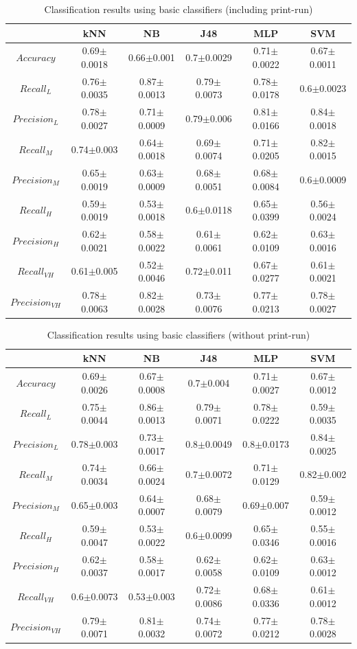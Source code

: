 \documentclass{llncs}
\begin{document}
\begin{table}
\caption{Classification results using basic classifiers (including print-run)}
\begin{centering}
\begin{tabular}{|c|c|c|c|c|c|}
\hline 
 & kNN & NB & J48 & MLP & SVM\tabularnewline
\hline 
\hline 
$Accuracy$  & 0.69$\pm$0.0018 & 0.66$\pm$0.001 & 0.7$\pm$0.0029 & 0.71$\pm$0.0022 & 0.67$\pm$0.0011\tabularnewline
\hline 
\hline 
$Recall_{L}$ & 0.76$\pm$0.0035 & 0.87$\pm$0.0013 & 0.79$\pm$0.0073 & 0.78$\pm$0.0178 & 0.6$\pm$0.0023\tabularnewline
\hline 
$Precision_{L}$ & 0.78$\pm$0.0027 & 0.71$\pm$0.0009 & 0.79$\pm$0.006 & 0.81$\pm$0.0166 & 0.84$\pm$0.0018\tabularnewline
\hline 
\hline 
$Recall_{M}$ & 0.74$\pm$0.003 & 0.64$\pm$0.0018 & 0.69$\pm$0.0074 & 0.71$\pm$0.0205 & 0.82$\pm$0.0015\tabularnewline
\hline 
$Precision_{M}$ & 0.65$\pm$0.0019 & 0.63$\pm$0.0009 & 0.68$\pm$0.0051 & 0.68$\pm$0.0084 & 0.6$\pm$0.0009\tabularnewline
\hline 
\hline 
$Recall_{H}$ & 0.59$\pm$0.0019 & 0.53$\pm$0.0018 & 0.6$\pm$0.0118 & 0.65$\pm$0.0399 & 0.56$\pm$0.0024\tabularnewline
\hline 
$Precision_{H}$ & 0.62$\pm$0.0021 & 0.58$\pm$0.0022 & 0.61$\pm$0.0061 & 0.62$\pm$0.0109 & 0.63$\pm$0.0016\tabularnewline
\hline 
\hline 
$Recall_{VH}$ & 0.61$\pm$0.005 & 0.52$\pm$0.0046 & 0.72$\pm$0.011 & 0.67$\pm$0.0277 & 0.61$\pm$0.0021\tabularnewline
\hline 
$Precision_{VH}$ & 0.78$\pm$0.0063 & 0.82$\pm$0.0028 & 0.73$\pm$0.0076 & 0.77$\pm$0.0213 & 0.78$\pm$0.0027\tabularnewline
\hline 
\end{tabular}
\par\end{centering}
\end{table}


\begin{table}
\caption{Classification results using basic classifiers (without print-run)}
\centering{}%
\begin{tabular}{|c|c|c|c|c|c|}
\hline 
 & kNN  & NB  & J48  & MLP  & SVM\tabularnewline
\hline 
\hline 
$Accuracy$  & 0.69$\pm$0.0026 & 0.67$\pm$0.0008 & 0.7$\pm$0.004 & 0.71$\pm$0.0027 & 0.67$\pm$0.0012\tabularnewline
\hline 
\hline 
$Recall_{L}$  & 0.75$\pm$0.0044 & 0.86$\pm$0.0013 & 0.79$\pm$0.0071 & 0.78$\pm$0.0222 & 0.59$\pm$0.0035\tabularnewline
\hline 
$Precision_{L}$  & 0.78$\pm$0.003 & 0.73$\pm$0.0017 & 0.8$\pm$0.0049 & 0.8$\pm$0.0173 & 0.84$\pm$0.0025\tabularnewline
\hline 
\hline 
$Recall_{M}$  & 0.74$\pm$0.0034 & 0.66$\pm$0.0024 & 0.7$\pm$0.0072 & 0.71$\pm$0.0129 & 0.82$\pm$0.002\tabularnewline
\hline 
$Precision_{M}$  & 0.65$\pm$0.003 & 0.64$\pm$0.0007 & 0.68$\pm$0.0079 & 0.69$\pm$0.007 & 0.59$\pm$0.0012\tabularnewline
\hline 
\hline 
$Recall_{H}$  & 0.59$\pm$0.0047 & 0.53$\pm$0.0022 & 0.6$\pm$0.0099 & 0.65$\pm$0.0346 & 0.55$\pm$0.0016\tabularnewline
\hline 
$Precision_{H}$  & 0.62$\pm$0.0037 & 0.58$\pm$0.0017 & 0.62$\pm$0.0058 & 0.62$\pm$0.0109 & 0.63$\pm$0.0012\tabularnewline
\hline 
\hline 
$Recall_{VH}$  & 0.6$\pm$0.0073 & 0.53$\pm$0.003 & 0.72$\pm$0.0086 & 0.68$\pm$0.0336 & 0.61$\pm$0.0012\tabularnewline
\hline 
$Precision_{VH}$  & 0.79$\pm$0.0071 & 0.81$\pm$0.0032 & 0.74$\pm$0.0072 & 0.77$\pm$0.0212 & 0.78$\pm$0.0028\tabularnewline
\hline 
\end{tabular}
\end{table}
\end{document}
